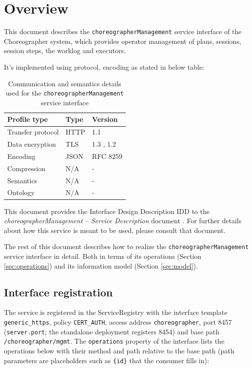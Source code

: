 \documentclass[a4paper]{arrowhead}
\begin{document}
\section{Overview}
\label{sec:overview}

This document describes the \texttt{choreographer\allowbreak{}Management} service interface of the Choreographer system, which provides operator management of plans, sessions, session steps, the worklog and executors.

It's implemented using protocol, encoding as stated in below table:
\begin{table}[ht!]
  \centering
  \begin{tabular}{|l|l|l|}
    \hline
    \rowcolor{gray!33} Profile type & Type & Version \\ \hline
    Transfer protocol & HTTP & 1.1 \cite{rfc9112} \\ \hline
    Data encryption & TLS & 1.3 \cite{rfc8446}, 1.2 \cite{rfc5246} \\ \hline
    Encoding & JSON & RFC 8259 \cite{rfc8259} \\ \hline
    Compression & N/A & - \\ \hline
    Semantics & N/A & - \\ \hline
    Ontology & N/A & - \\ \hline
  \end{tabular}
  \caption{Communication and semantics details used for the \texttt{choreographer\allowbreak{}Management} service interface}
  \label{tab:comunication_semantics_profile}
\end{table}

This document provides the Interface Design Description IDD to the \textit{choreographerManagement -- Service Description} document \cite{cho-choreographerManagement-sd}.
For further details about how this service is meant to be used, please consult that document.

The rest of this document describes how to realize the \texttt{choreographer\allowbreak{}Management} service
interface in detail. Both in terms of its operations (Section \ref{sec:operations}) and its information model (Section \ref{sec:model}).

\subsection{Interface registration}

The service is registered in the ServiceRegistry with the interface template \texttt{generic\_\allowbreak{}https}, policy \texttt{CERT\_\allowbreak{}AUTH}, access address \texttt{choreographer}, port 8457 (\texttt{server.\allowbreak{}port}; the standalone deployment registers 8454) and base path \texttt{/\allowbreak{}choreographer/\allowbreak{}mgmt}. The \texttt{operations} property of the interface lists the operations below with their method and path relative to the base path (path parameters are placeholders such as \texttt{\{id\}} that the consumer fills in):
\end{document}
